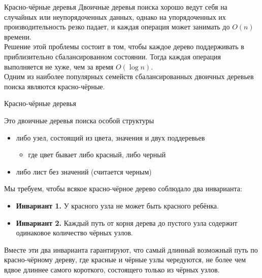 \begin{frame}{Красно-чёрные деревья}
Двоичные деревья поиска хорошо ведут себя на случайных или неупорядоченных данных,
однако на упорядоченных их производительность резко падает, и
каждая операция может занимать до $O(n)$  времени. \\

 Решение этой
проблемы состоит в том, чтобы каждое дерево поддерживать в
приблизительно сбалансированном состоянии. Тогда каждая операция
выполняется не хуже, чем за время $O(\log n)$. \\

 Одним из наиболее
популярных семейств сбалансированных двоичных деревьев поиска являются
красно-чёрные.
\end{frame}

\begin{frame}[fragile]{}{Красно-чёрные деревья}

\begin{definition}
Это двоичные деревья поиска особой структуры
\begin{itemize}
\item либо узел, состоящий из цвета, значения и двух поддеревьев
\begin{itemize}
\item где цвет бывает либо красный, либо черный
\end{itemize}
\item либо лист без значений (считается черным)
\end{itemize}
\end{definition}
\vspace{1em}


Мы требуем, чтобы всякое красно-чёрное дерево соблюдало два
инварианта:
\begin{itemize}
  \item \textbf{Инвариант 1.} У красного узла не может быть красного ребёнка.
  \item \textbf{Инвариант 2.} Каждый путь от корня дерева до пустого
  узла содержит одинаковое количество чёрных узлов.
\end{itemize}
Вместе эти два инварианта гарантируют, что самый длинный возможный
путь по красно-чёрному дереву, где красные и чёрные узлы чередуются,
не более чем вдвое длиннее самого короткого, состоящего только из
чёрных узлов.

\end{frame}


